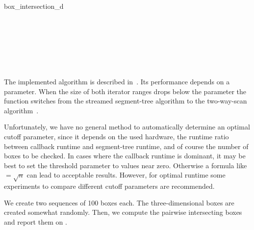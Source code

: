 \begin{ccRefFunction}{box_intersection_d}
\ccSeeAlso

\\

\\
\\

\begin{ccAdvanced}

\\

\end{ccAdvanced}

\ccImplementation

The implemented algorithm is described in~\cite{cgal:ze-fsbi-02}.  Its
performance depends on a  parameter. When the size of both
iterator ranges drops below the  parameter the function
switches from the streamed segment-tree algorithm to the two-way-scan
algorithm~\cite{cgal:ze-fsbi-02}. 

Unfortunately, we have no general method to automatically determine an
optimal cutoff parameter, since it depends on the used hardware, the
runtime ratio between callback runtime and segment-tree runtime, and
of course the number of boxes to be checked. In cases where the
callback runtime is dominant, it may be best to set the threshold
parameter to values near zero. Otherwise a formula like
$=\sqrt{n}$ can lead to acceptable results. However, for
optimal runtime some experiments to compare different cutoff
parameters are recommended.

\ccExample

We create two sequences of 100 boxes each. The three-dimensional boxes
are created somewhat randomly. Then, we compute the pairwise
intersecting boxes and report them on .


\end{ccRefFunction}


